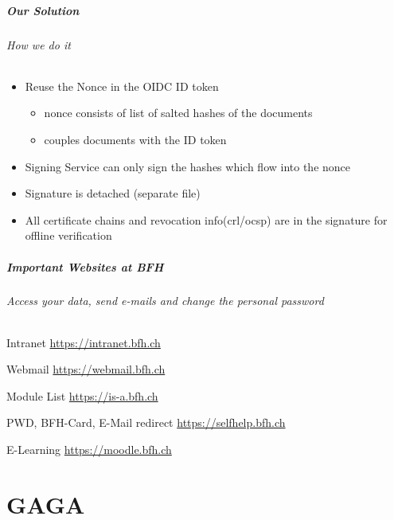 \begin{frame}[t]\frametitle{Our Solution}
	\framesubtitle{How we do it}
	\begin{itemize}
		\item Reuse the Nonce in the OIDC ID token
		\begin{itemize}
			\item nonce consists of list of salted hashes of the documents
			\item couples documents with the ID token
		\end{itemize}
		\item Signing Service can only sign the hashes which flow into the nonce
		\item Signature is detached (separate file)
		\item All certificate chains and revocation info(crl/ocsp) are in the signature for offline verification
	\end{itemize}
\end{frame}

\begin{frame}[c]\frametitle{Important Websites at BFH}
  \framesubtitle{Access your data, send e-mails and change the personal password}
  \begin{block}{Intranet}
    \url{https://intranet.bfh.ch}
  \end{block}
  \begin{alertblock}{Webmail}
    \url{https://webmail.bfh.ch}
  \end{alertblock}
  \begin{block}{Module List}
    \url{https://is-a.bfh.ch}
  \end{block}
  \begin{alertblock}{PWD, BFH-Card, E-Mail redirect}
    \url{https://selfhelp.bfh.ch}
  \end{alertblock}
  \begin{block}{E-Learning}
    \url{https://moodle.bfh.ch}
  \end{block}
\end{frame}

\part{GAGA}

